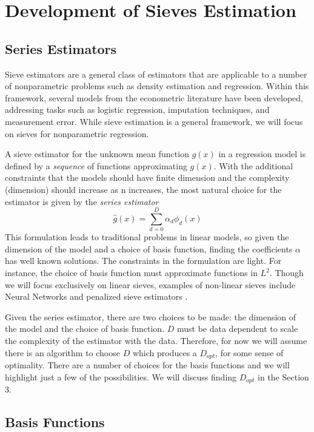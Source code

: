 \documentclass[12pt]{article}  %
\begin{document}
\section{Development of Sieves Estimation}

\subsection{Series Estimators}
Sieve estimators are a general class of estimators that are applicable to a number of nonparametric problems such as density estimation and regression. Within this framework, several models from the econometric literature have been developed, addressing tasks such as logistic regression, imputation techniques, and measurement error. While sieve estimation is a general framework, we will focus on sieves for nonparametric regression. 

A sieve estimator for the unknown mean function $g(x)$ in a regression model is defined by a \textit{sequence} of functions approximating $g(x)$. With the additional constraints that the models should have finite dimension and the complexity (dimension) should increase as n increases, the most natural choice for the estimator is given by the \textit{series estimator} 
$$ \hat{g}(x) = \sum_{d=0}^{D} \alpha_{d} \phi_{d}(x)$$ 
This formulation leads to traditional problems in linear models, so given the dimension of the model and a choice of basis function, finding the coefficients $\alpha$ has well known solutions. The constraints in the formulation are light. For instance, the choice of basis function must approximate functions in $L^2$. Though we will focus exclusively on linear sieves, examples of non-linear sieves include Neural Networks and penalized sieve estimators \cite{Chen}. 

Given the series estimator, there are two choices to be made: the dimension of the model and the choice of basis function.  $D$ must be data dependent to scale the complexity of the estimator with the data. Therefore, for now we will assume there is an algorithm to choose $D$ which produces a $D_{opt}$, for some sense of optimality. There are a number of choices for the basis functions and we will highlight just a few  of the possibilities. We will discuss finding $D_{opt}$ in the Section 3. 

\subsection{Basis Functions}
\end{document}
